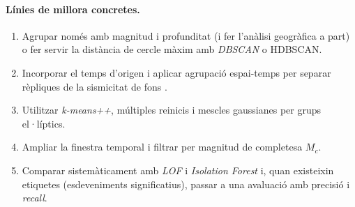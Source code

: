 \documentclass[11pt,a4paper]{article}
\begin{document}
\paragraph{Línies de millora concretes.}
\begin{enumerate}[nosep]
  \item Agrupar només amb magnitud i profunditat (i fer l'anàlisi geogràfica
        a part) o fer servir la distància de cercle màxim amb \textit{DBSCAN}
        o HDBSCAN.
  \item Incorporar el temps d'origen i aplicar agrupació espai-temps per
        separar rèpliques de la sismicitat de fons \cite{zaliapin2013}.
  \item Utilitzar \textit{k-means++}, múltiples reinicis i mescles gaussianes
        per grups el·líptics.
  \item Ampliar la finestra temporal i filtrar per magnitud de completesa
        $M_c$.
  \item Comparar sistemàticament amb \textit{LOF} i \textit{Isolation Forest}
        i, quan existeixin etiquetes (esdeveniments significatius), passar a
        una avaluació amb precisió i \textit{recall}.
\end{enumerate}
\end{document}
